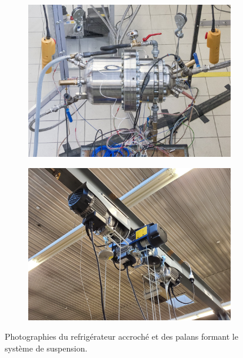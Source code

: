 \begin{figure}[!ht]
    \centering
	\begin{subfigure}{.47\textwidth}
		\centering
		\includegraphics[width=\textwidth]{../fig/fig_SystemeAccroche/Machine_horizBetter_cropped.jpg}
		\caption{}
		\label{fig:TACOTSuspendu_Frigo}
	\end{subfigure}		
	\begin{subfigure}{.47\textwidth}
		\centering
		\includegraphics[width=\textwidth]{../fig/fig_SystemeAccroche/Palans.jpg}
		\caption{}
		\label{fig:TACOTSuspendu_Palans}
	\end{subfigure}	    
    \caption{Photographies  du refrigérateur accroché et  des palans formant le système de suspension.}
    \label{fig:TACOTSuspendu}
\end{figure}

